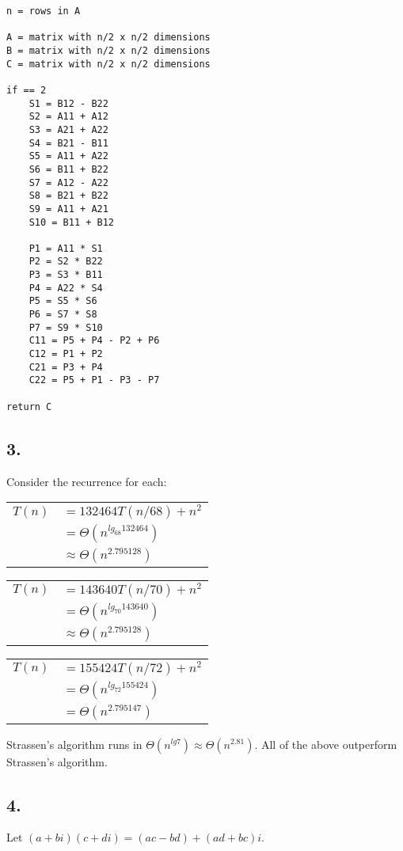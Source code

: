 \documentclass[11pt,letterpaper]{article}
\begin{document}
\lstset{numbers=left}
\begin{lstlisting}
n = rows in A

A = matrix with n/2 x n/2 dimensions
B = matrix with n/2 x n/2 dimensions
C = matrix with n/2 x n/2 dimensions

if == 2
	S1 = B12 - B22
	S2 = A11 + A12
	S3 = A21 + A22
	S4 = B21 - B11
	S5 = A11 + A22
	S6 = B11 + B22
	S7 = A12 - A22
	S8 = B21 + B22
	S9 = A11 + A21
	S10 = B11 + B12

	P1 = A11 * S1
	P2 = S2 * B22
	P3 = S3 * B11
	P4 = A22 * S4
	P5 = S5 * S6
	P6 = S7 * S8
	P7 = S9 * S10
	C11 = P5 + P4 - P2 + P6
	C12 = P1 + P2
	C21 = P3 + P4
	C22 = P5 + P1 - P3 - P7

return C
\end{lstlisting}

\subsection*{3.}
Consider the recurrence for each:
\\
\begin{tabular}{l l}
	$ T(n) $	&	$ = 132464 T(n/68) + n^2 $ \\
			&	$ = \Theta( n^{lg_{68} 132464} ) $ \\
			&	$ \approx \Theta( n^{2.795128} ) $
\end{tabular}

\begin{tabular}{l l}
	$ T(n) $	&	$ = 143640 T(n/70) + n^2 $ \\
			&	$ = \Theta( n^{lg_{70} 143640} ) $ \\
			&	$ \approx \Theta( n^{2.795128} ) $
\end{tabular}

\begin{tabular}{l l}
	$ T(n) $	&	$ = 155424 T(n/72) + n^2 $ \\
			&	$ = \Theta( n^{lg_{72} 155424} ) $ \\
			&	$ = \Theta( n^{2.795147} ) $
\end{tabular}

Strassen's algorithm runs in $\Theta( n^{lg 7} ) \approx \Theta( n^{2.81} ) $. All of the above outperform 
Strassen's algorithm.


\subsection*{4.}
Let $ (a + bi) (c + di) = (ac - bd) + (ad + bc) i$.
\end{document}
